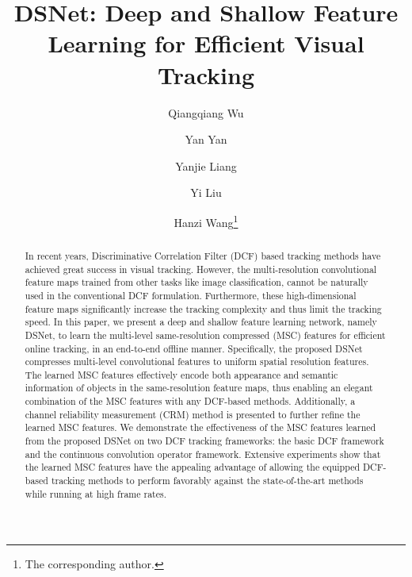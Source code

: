 \documentclass[runningheads]{llncs}
\begin{document}
\title{DSNet: Deep and Shallow Feature Learning for Efficient Visual Tracking}  %


\author{Qiangqiang Wu\and %
Yan Yan \and %
Yanjie Liang \and %
Yi Liu \and %
Hanzi Wang\thanks{The corresponding author.}} %





\maketitle

\begin{abstract}
In recent years, Discriminative Correlation Filter (DCF) based tracking methods have achieved great success in visual tracking. However, the multi-resolution convolutional feature maps trained from other tasks like image classification, cannot be naturally used in the conventional DCF formulation. Furthermore, these high-dimensional feature maps significantly increase the tracking complexity and thus limit the tracking speed. In this paper, we present a deep and shallow feature learning network, namely DSNet, to learn the multi-level same-resolution compressed (MSC) features for efficient online tracking, in an end-to-end offline manner. Specifically, the proposed DSNet compresses multi-level convolutional features to uniform spatial resolution features. The learned MSC features effectively encode both appearance and semantic information of objects in the same-resolution feature maps, thus enabling an elegant combination of the MSC features with any DCF-based methods. Additionally, a channel reliability measurement (CRM) method is presented to further refine the learned MSC features. We demonstrate the effectiveness of the MSC features learned from the proposed DSNet on two DCF tracking frameworks: the basic DCF framework and the continuous convolution operator framework. Extensive experiments show that the learned MSC features have the appealing advantage of allowing the equipped DCF-based tracking methods to perform favorably against the state-of-the-art methods while running at high frame rates. 

\end{abstract}
\end{document}
